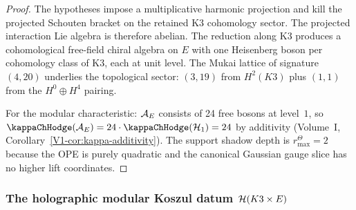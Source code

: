 \begin{proof}
The hypotheses impose a multiplicative harmonic projection and kill the
projected Schouten bracket on the retained K3 cohomology sector. The
projected interaction Lie algebra is therefore abelian. The reduction
along K3 produces a cohomological free-field chiral algebra on $E$ with
one Heisenberg boson per cohomology class of K3, each at unit level.
The Mukai lattice of signature $(4, 20)$ underlies the
topological sector: $(3, 19)$ from $H^2(K3)$ plus $(1, 1)$ from the
$H^0 \oplus H^4$ pairing.

For the modular characteristic: $\mathcal{A}_E$ consists of 24 free
bosons at level~$1$, so
\(\kappaChHodge(\cA_E)=24 \cdot \kappaChHodge(\cH_1) = 24\)
by additivity (Volume~I, Corollary~\ref{V1-cor:kappa-additivity}).
The support shadow depth is \(r^\Theta_{\max}=2\) because the OPE is
purely quadratic and the canonical Gaussian gauge slice has no higher
lift coordinates.
\end{proof}


\subsubsection{The holographic modular Koszul datum
\texorpdfstring{$\mathcal{H}(K3 \times E)$}{H(K3 x E)}}
\label{subsubsec:k3e-holographic-datum}

